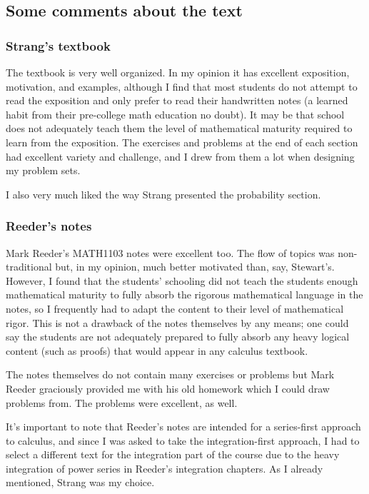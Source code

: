 \documentclass[11pt,oneside]{amsart}
\begin{document}
\subsection{Some comments about the text}

\subsubsection{Strang's textbook}
The textbook is very well organized. In my opinion it has excellent exposition, motivation, and examples, although I find that most students do not attempt to read the exposition and only prefer to read their handwritten notes (a learned habit from their pre-college math education no doubt). It may be that school does not adequately teach them the level of mathematical maturity required to learn from the exposition. The exercises and problems at the end of each section had excellent variety and challenge, and I drew from them a lot when designing my problem sets.

I also very much liked the way Strang presented the probability section.

\subsubsection{Reeder's notes}
Mark Reeder's MATH1103 notes were excellent too. The flow of topics was non-traditional but, in my opinion, much better motivated than, say, Stewart's. However, I found that the students' schooling did not teach the students enough mathematical maturity to fully absorb the rigorous mathematical language in the notes, so I frequently had to adapt the content to their level of mathematical rigor. This is not a drawback of the notes themselves by any means; one could say the students are not adequately prepared to fully absorb any heavy logical content (such as proofs) that would appear in any calculus textbook.

The notes themselves do not contain many exercises or problems but Mark Reeder graciously provided me with his old homework which I could draw problems from. The problems were excellent, as well.

It's important to note that Reeder's notes are intended for a series-first approach to calculus, and since I was asked to take the integration-first approach, I had to select a different text for the integration part of the course due to the heavy integration of power series in Reeder's integration chapters. As I already mentioned, Strang was my choice.
\end{document}
